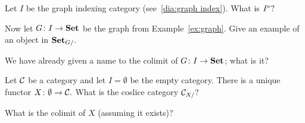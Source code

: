 \documentclass[CT4S-EN-RU]{subfiles}
\begin{document}
\begin{exerciseENG}
Let $I$ be the graph indexing category (see~\ref{dia:graph index}).
\sexc What is $I^\triangleright?$
\item Now let $G\colon I\rightarrow{\mathbf{Set}}$ be the graph from Example~\ref{ex:graph}. Give an example of an object in ${\mathbf{Set}}_{G/}.$ 
\item We have already given a name to the colimit of $G\colon I\rightarrow{\mathbf{Set}}$; what is it?
\endsexc
\end{exerciseENG}

\begin{exerciseRUS}
\end{exerciseRUS}

\begin{exerciseENG}\label{exc:initial as colimit}
Let $\mathcal{C}$ be a category and let $I=\emptyset$ be the empty category. There is a unique functor $X\colon\emptyset\rightarrow\mathcal{C}.$
\sexc What is the coslice category $\mathcal{C}_{X/}?$
\item What is the colimit of $X$ (assuming it exists)?
\endsexc
\end{exerciseENG}

\begin{exerciseRUS}\label{exc:initial as colimit}
\end{exerciseRUS}
\end{document}
